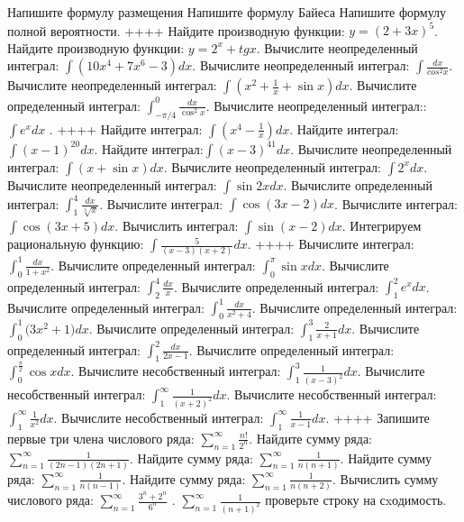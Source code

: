 Напишите формулу размещения
Напишите формулу Байеса
Напишите формулу полной вероятности.
++++
Найдите производную функции: \(y = (2 + 3x)^{5}\).
Найдите производную функции: \(y = 2^{x} + tgx\).
Вычислите неопределенный интеграл: \(\int{\left( 10x^{4} + 7x^{6} - 3 \right)dx}\).
Вычислите неопределенный интеграл: \(\int\frac{dx}{cos^{2}x}\).
Вычислите неопределенный интеграл: \(\int{\left( x^{2} + \frac{1}{x} + \sin x \right)dx}\).
Вычислите определенный интеграл: \(\int_{-\pi/4}^{0}\frac{dx}{\cos^2x}\).
Вычислите неопределенный интеграл:: \(\int{e^{x}dx}\) .
++++
Найдите интеграл: \(\int\left( x^{4} - \frac{1}{x} \right)dx\).
Найдите интеграл:\(\int{(x - 1)^{20}}dx\).
Найдите интеграл:\(\int{(x - 3)^{41}}dx\).
Вычислите неопределенный интеграл: \(\int{(x + \sin x)}dx\).
Вычислите неопределенный интеграл: \(\int2^{x}dx\).
Вычислите неопределенный интеграл: \(\int{\sin{2x}dx}\).
Вычислите определенный интеграл: \(\int_{1}^{4}\frac{dx}{\sqrt[3]{x}}\).
Вычислите интеграл: \(\int{\cos(3x - 2)dx}\).
Вычислите интеграл: \(\int{\cos(3x + 5)dx}\).
Вычислить интеграл: \(\int{\sin(x - 2)dx}\).
Интегрируем рациональную функцию: \(\int{\frac{5}{(x - 3)(x + 2)}dx}\).
++++
Вычислите интеграл: \(\int_{0}^{1}\frac{dx}{1 + x^{2}}\).
Вычислите определенный интеграл: \(\int_{0}^{\pi}{\sin xdx}\).
Вычислите определенный интеграл: \(\int_{2}^{4}\frac{dx}{x}\).
Вычислите определенный интеграл: \(\int_{1}^{2}{e^{x}dx}\).
Вычислите определенный интеграл: \(\int_{0}^{1}\frac{dx}{x^{2} + 4}\).
Вычислите определенный интеграл: \(\int_{0}^{1}{(3x^{2}} + 1)dx\).
Вычислите определенный интеграл: \(\int_{1}^{3}{\frac{2}{x + 1}dx}\).
Вычислите определенный интеграл: \(\int_{1}^{2}\frac{dx}{2x -1}\).
Вычислите определенный интеграл: \(\int_{0}^{\frac{\pi}{2}}{\cos xdx}\).
Вычислите несобственный интеграл: \(\int_{1}^{3}{\frac{1}{(x - 3)^{2}}dx}\).
Вычислите несобственный интеграл: \(\int_{1}^{\infty}{\frac{1}{(x + 2)^{2}}dx}\).
Вычислите несобственный интеграл: \(\int_{1}^{\infty}{\frac{1}{x^{2}}dx}\).
Вычислите несобственный интеграл: \(\int_{1}^{\infty}{\frac{1}{x - 1}dx}\).
++++
Запишите первые три члена числового ряда: \(\sum_{n = 1}^{\infty}\frac{n!}{2^{n}}\).
Найдите сумму ряда: \(\sum_{n = 1}^{\infty}\frac{1}{(2n - 1)(2n + 1)}\).
Найдите сумму ряда: \(\sum_{n = 1}^{\infty}\frac{1}{n(n + 1)}\).
Найдите сумму ряда: \(\sum_{n = 1}^{\infty}\frac{1}{n(n - 1)}\).
Найдите сумму ряда: \(\sum_{n = 1}^{\infty}\frac{1}{n(n + 2)}\).
Вычислить сумму числового ряда: \(\sum_{n = 1}^{\infty}\frac{3^{n} + 2^{n}}{6^{n}}\) .
\(\sum_{n = 1}^{\infty}\frac{1}{(n + 1)^{2}}\) проверьте строку на сxодимость.

